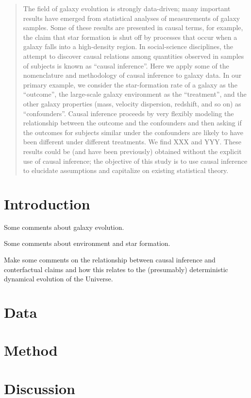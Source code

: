 \documentclass[12pt, letterpaper, preprint]{aastex}
\begin{document}
\begin{abstract}
The field of galaxy evolution is strongly data-driven; many important
results have emerged from statistical analyses of measurements of
galaxy samples.
Some of these results are presented in causal terms, for example, the
claim that star formation is shut off by processes that occur when a
galaxy falls into a high-density region.
In social-science disciplines, the attempt to discover causal
relations among quantities observed in samples of subjects is known as
``causal inference''.
Here we apply some of the nomenclature and methodology of
causal inference to galaxy data.
In our primary example, we consider the star-formation rate of a
galaxy as the ``outcome'', the large-scale galaxy environment as the
``treatment'', and the other galaxy properties (mass, velocity
dispersion, redshift, and so on) as ``confounders''.
Causal inference proceeds by very flexibly modeling the relationship
between the outcome and the confounders and then asking if the
outcomes for subjects similar under the confounders are likely to have
been different under different treatments.
We find XXX and YYY.
These results could be (and have been previously) obtained without the
explicit use of causal inference; the objective of this study is to
use causal inference to elucidate assumptions and capitalize on
existing statistical theory.
\end{abstract}

\section{Introduction}

Some comments about galaxy evolution.

Some comments about environment and star formation.

Make some comments on the relationship between causal inference and
conterfactual claims and how this relates to the (presumably)
deterministic dynamical evolution of the Universe.

\section{Data}

\section{Method}

\section{Discussion}
\end{document}
